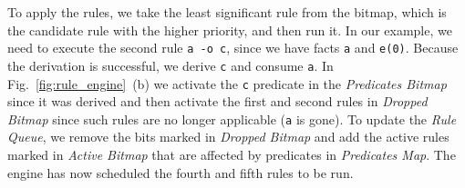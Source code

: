 To apply the rules, we take the least significant rule from the bitmap, which is the candidate rule with the higher priority, and then run it. In our example, we need to execute the second rule \texttt{a -o c}, since we have facts \texttt{a} and \texttt{e(0)}.
Because the derivation is successful, we derive \texttt{c} and consume \texttt{a}. In Fig.~\ref{fig:rule_engine}~(b) we
activate the \texttt{c} predicate in the \emph{Predicates Bitmap} since it was derived and then activate the first and second rules
in \emph{Dropped Bitmap} since such rules are no longer applicable (\texttt{a} is gone). To update the \emph{Rule Queue},
we remove the bits marked in \emph{Dropped Bitmap} and add the active rules marked in \emph{Active Bitmap} that are affected
by predicates in \emph{Predicates Map}. The engine has now scheduled the fourth and fifth rules to be run.

